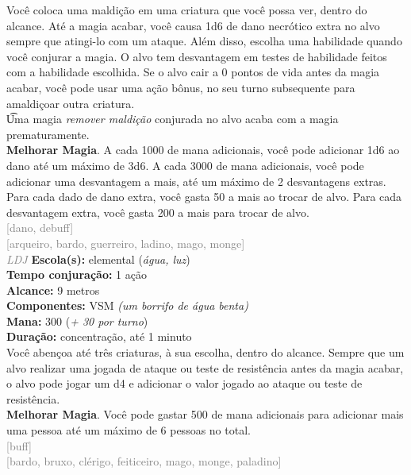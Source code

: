 \documentclass{RPG_Adventure}[2021/10/20]
\begin{document}
{\normalsize Você coloca uma maldição em uma criatura que você possa ver, dentro do alcance. Até a magia acabar, você causa 1d6 de dano necrótico extra no alvo sempre que atingi-lo com um ataque. Além disso, escolha uma habilidade quando você conjurar a magia. O alvo tem desvantagem em testes de habilidade feitos com a habilidade escolhida.  Se o alvo cair a 0 pontos de vida antes da magia acabar, você pode usar uma ação bônus, no seu turno subsequente para amaldiçoar outra criatura.\\\t Uma magia \textit{remover maldição} conjurada no alvo acaba com a magia prematuramente.\\\t \textbf{Melhorar Magia}. A cada 1000 de mana adicionais, você pode adicionar 1d6 ao dano até um máximo de 3d6. A cada 3000 de mana adicionais, você pode adicionar uma desvantagem a mais, até um máximo de 2 desvantagens extras. Para cada dado de dano extra, você gasta 50 a mais ao trocar de alvo. Para cada desvantagem extra, você gasta 200 a mais para trocar de alvo.\\}
{\scriptsize \textcolor{gray}{[dano, debuff]\\}}
{\scriptsize \textcolor{gray}{[arqueiro, bardo, guerreiro, ladino, mago, monge]\\}}
{\tiny \textcolor{gray}{\textit{LDJ}}}
{\small \t \textbf{Escola(s):} elemental (\textit{água, luz})\\\t \textbf{Tempo conjuração:} 1 ação\\\t \textbf{Alcance:} 9 metros\\\t \textbf{Componentes:} VSM \textit{(um borrifo de água benta)}\\\t \textbf{Mana:} 300 (\textit{+ 30 por turno})\\\t \textbf{Duração:} concentração, até 1 minuto\\}
{\normalsize Você abençoa até três criaturas, à sua escolha, dentro do alcance. Sempre que um alvo realizar uma jogada de ataque ou teste de resistência antes da magia acabar, o alvo pode jogar um d4 e adicionar o valor jogado ao ataque ou teste de resistência.\\\t \textbf{Melhorar Magia}. Você pode gastar 500 de mana adicionais para adicionar mais uma pessoa até um máximo de 6 pessoas no total.\\}
{\scriptsize \textcolor{gray}{[buff]\\}}
{\scriptsize \textcolor{gray}{[bardo, bruxo, clérigo, feiticeiro, mago, monge, paladino]\\}}
\end{document}
